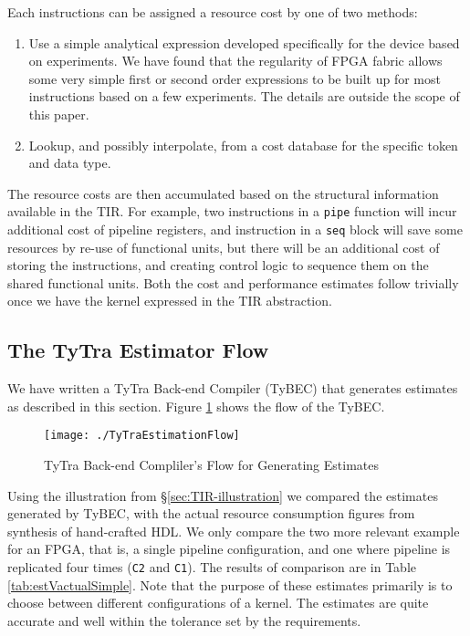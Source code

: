 \documentclass[]{heart2015_WN4Pre}
\begin{document}
Each instructions can be assigned a resource cost by one of two methods:

\begin{enumerate}
	\item Use a simple analytical expression developed specifically for the device based on experiments. We have found that the regularity of FPGA fabric allows some very simple first or second order expressions to be built up for most instructions based on a few experiments. The details are outside the scope of this paper.
	\item Lookup, and possibly interpolate, from a cost database for the specific token and data type. 
\end{enumerate}

The resource costs are then accumulated based on the structural information available in the TIR. For example, two instructions in a \texttt{pipe} function will incur additional cost of pipeline registers, and instruction in a \texttt{seq} block will save some resources by re-use of functional units, but there will be an additional cost of storing the instructions, and creating control logic to sequence them on the shared functional units.
Both the cost and performance estimates follow trivially once we have the kernel expressed in the TIR abstraction.

\subsection{The TyTra Estimator Flow}
\label{sec:estimator-flow}

We have written a TyTra Back-end Compiler (TyBEC) that generates estimates as described in this section. Figure \ref{fig:TyTraEstimationFlow} shows the flow of the TyBEC.  

\begin{figure}[tbh]
\centering
\texttt{[image: ./TyTraEstimationFlow]}
\caption{TyTra Back-end Compliler's Flow for Generating Estimates}
\label{fig:TyTraEstimationFlow}
\end{figure}

Using the illustration from \S\ref{sec:TIR-illustration} we compared the estimates generated by TyBEC, with the actual resource consumption figures from synthesis of hand-crafted HDL. We only compare the two more relevant example for an FPGA, that is, a single pipeline configuration, and one where pipeline is replicated four times (\texttt{C2} and \texttt{C1}). The results of comparison are in Table \ref{tab:estVactualSimple}. Note that the purpose of these estimates primarily is to choose between different configurations of a kernel. The estimates are quite accurate and well within the tolerance set by the requirements.
\end{document}
